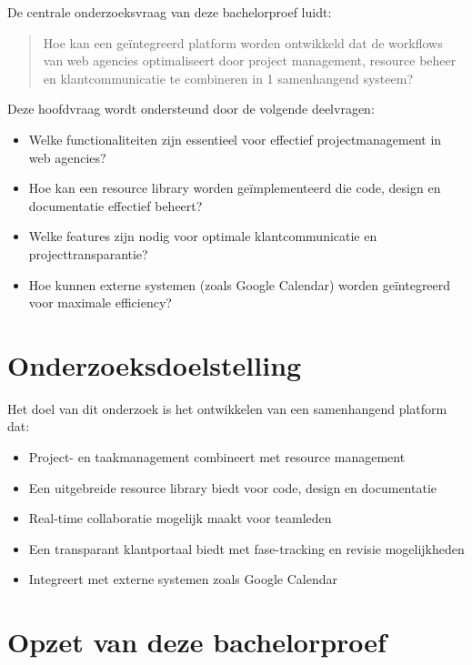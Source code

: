 De centrale onderzoeksvraag van deze bachelorproef luidt:

\begin{quote}
    Hoe kan een geïntegreerd platform worden ontwikkeld dat de workflows van web agencies optimaliseert door project management, resource beheer en klantcommunicatie te combineren in 1 samenhangend systeem?
\end{quote}

Deze hoofdvraag wordt ondersteund door de volgende deelvragen:

\begin{itemize}
    \item Welke functionaliteiten zijn essentieel voor effectief projectmanagement in web agencies?
    \item Hoe kan een resource library worden geïmplementeerd die code, design en documentatie effectief beheert?
    \item Welke features zijn nodig voor optimale klantcommunicatie en projecttransparantie?
    \item Hoe kunnen externe systemen (zoals Google Calendar) worden geïntegreerd voor maximale efficiency?
\end{itemize}

\section{Onderzoeksdoelstelling}
\label{sec:onderzoeksdoelstelling}

Het doel van dit onderzoek is het ontwikkelen van een samenhangend platform dat:

\begin{itemize}
    \item Project- en taakmanagement combineert met resource management
    \item Een uitgebreide resource library biedt voor code, design en documentatie
    \item Real-time collaboratie mogelijk maakt voor teamleden
    \item Een transparant klantportaal biedt met fase-tracking en revisie mogelijkheden
    \item Integreert met externe systemen zoals Google Calendar
\end{itemize}

\section{Opzet van deze bachelorproef}
\label{sec:opzet}

